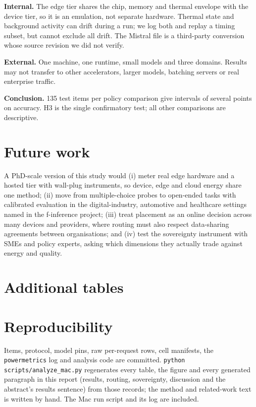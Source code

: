 \documentclass[10pt,twocolumn]{article}
\begin{document}
\textbf{Internal.} The edge tier shares the chip, memory and thermal envelope with the device tier, so it is an emulation, not separate hardware. Thermal state and background activity can drift during a run; we log both and replay a timing subset, but cannot exclude all drift. The Mistral file is a third-party conversion whose source revision we did not verify.

\textbf{External.} One machine, one runtime, small models and three domains. Results may not transfer to other accelerators, larger models, batching servers or real enterprise traffic.

\textbf{Conclusion.} 135 test items per policy comparison give intervals of several points on accuracy. H3 is the single confirmatory test; all other comparisons are descriptive.

\section{Future work}\label{sec:future}
A PhD-scale version of this study would (i) meter real edge hardware and a hosted tier with wall-plug instruments, so device, edge and cloud energy share one method; (ii) move from multiple-choice probes to open-ended tasks with calibrated evaluation in the digital-industry, automotive and healthcare settings named in the f-inference project; (iii) treat placement as an online decision across many devices and providers, where routing must also respect data-sharing agreements between organisations; and (iv) test the sovereignty instrument with SMEs and policy experts, asking which dimensions they actually trade against energy and quality.

\clearpage
\appendix
\section{Additional tables}


\section*{Reproducibility}
Items, protocol, model pins, raw per-request rows, cell manifests, the \texttt{powermetrics} log and analysis code are committed. \texttt{python scripts/analyze\_mac.py} regenerates every table, the figure and every generated paragraph in this report (results, routing, sovereignty, discussion and the abstract's results sentence) from those records; the method and related-work text is written by hand. The Mac run script and its log are included.
\end{document}
